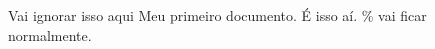 \documentclass{article}
\begin{document}
	Vai ignorar isso aqui	
	Meu primeiro documento. É isso aí. \% vai ficar normalmente.
	
\end{document}
